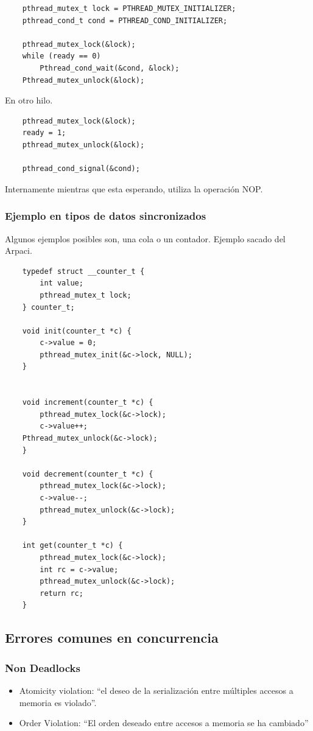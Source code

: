 \documentclass[titlepage,a4paper]{article}
\begin{document}
\begin{verbatim}
    pthread_mutex_t lock = PTHREAD_MUTEX_INITIALIZER;
    pthread_cond_t cond = PTHREAD_COND_INITIALIZER;
    
    pthread_mutex_lock(&lock);
    while (ready == 0)
        Pthread_cond_wait(&cond, &lock);
    Pthread_mutex_unlock(&lock);
\end{verbatim}

En otro hilo.
\begin{verbatim}
    pthread_mutex_lock(&lock);
    ready = 1;
    pthread_mutex_unlock(&lock);
    
    pthread_cond_signal(&cond);
\end{verbatim}

Internamente mientras que esta esperando, utiliza la operación NOP.


\subsubsection*{Ejemplo en tipos de datos sincronizados}
Algunos ejemplos posibles son, una cola o un contador. Ejemplo sacado del Arpaci.
\begin{verbatim}
    typedef struct __counter_t {
        int value;
        pthread_mutex_t lock;
    } counter_t;
    
    void init(counter_t *c) {
        c->value = 0;
        pthread_mutex_init(&c->lock, NULL);
    }
    
    
    void increment(counter_t *c) {
        pthread_mutex_lock(&c->lock);
        c->value++;
    Pthread_mutex_unlock(&c->lock);
    }
    
    void decrement(counter_t *c) {
        pthread_mutex_lock(&c->lock);
        c->value--;
        pthread_mutex_unlock(&c->lock);
    }
    
    int get(counter_t *c) {
        pthread_mutex_lock(&c->lock);
        int rc = c->value;
        pthread_mutex_unlock(&c->lock);
        return rc;
    }
\end{verbatim}

\subsection*{Errores comunes en concurrencia}

\subsubsection*{Non Deadlocks}
\begin{itemize}
    \item Atomicity violation: “el deseo de la serialización entre múltiples accesos a memoria es violado”.
    \item Order Violation: “El orden deseado entre accesos a memoria se ha cambiado”
\end{itemize}
\end{document}
